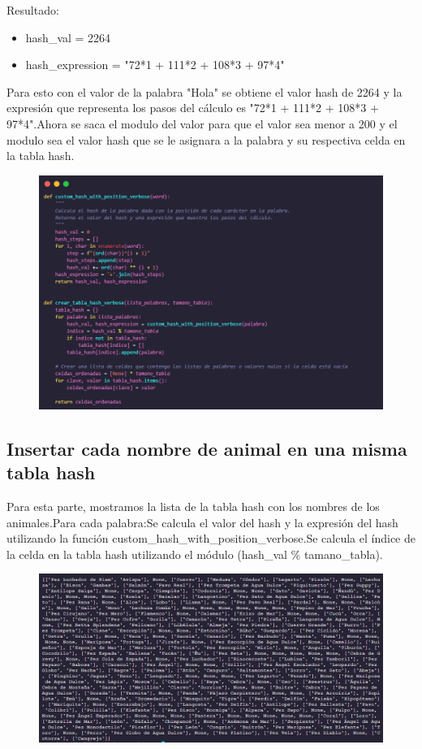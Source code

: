 Resultado:
\begin{itemize}
  \item hash\_val = 2264
  \item hash\_expression = "72*1 + 111*2 + 108*3 + 97*4"
\end{itemize}

Para esto con el valor de la palabra "Hola" se obtiene el valor hash de 2264 y la expresión que representa los pasos del cálculo es "72*1 + 111*2 + 108*3 + 97*4".\newline Ahora se saca el modulo del valor para que el valor sea menor a 200 y el modulo sea el valor hash que se le asignara a la palabra y su respectiva celda en la tabla hash.

\begin{figure}[ht]
  \centering
  \includegraphics[width=0.7\linewidth]{./src/img/hash/image3.png}
\end{figure}

\newpage
\subsection{Insertar cada nombre de animal en una misma tabla hash}

Para esta parte, mostramos la lista de la tabla hash con los nombres de los animales.\newline Para cada palabra:\newline Se calcula el valor del hash y la expresión del hash utilizando la función custom\_hash\_with\_position\_verbose.\newline Se calcula el índice de la celda en la tabla hash utilizando el módulo (hash\_val \% tamano\_tabla).

\begin{figure}[ht]
  \centering
  \includegraphics[width=0.7\linewidth]{./src/img/hash/image4.png}
\end{figure}


